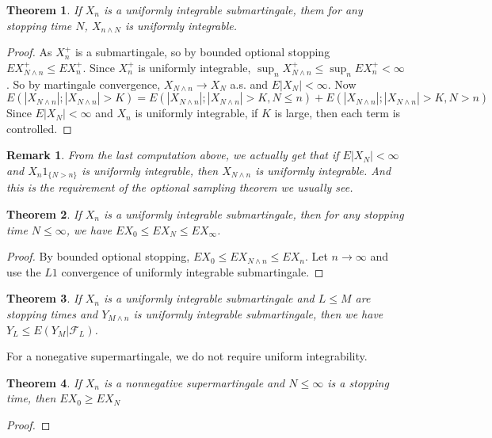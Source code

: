 \documentclass{article}
\newtheorem{Thm}{Theorem}[section]
\newtheorem*{Rk}{Remark}
\theoremstyle{definition}
\begin{document}
\begin{Thm}
    If $X_n$ is a uniformly integrable submartingale, them for any stopping time $N$,
    $X_{n\wedge N}$ is uniformly integrable.
\end{Thm}
\begin{proof}
    As $X_n^+$ is a submartingale, so by bounded optional stopping $EX_{N\wedge n}^+ \le EX_n^+$.
    Since $X_n^+$ is uniformly integrable, $\sup_n X_{N\wedge n}^+ \le \sup_n EX_n^+ <\infty$. So by martingale convergence, $X_{N\wedge n}\to X_N$ a.s. and $E|X_N|<\infty$.
    Now
    \begin{equation*}
        E(|X_{N\wedge n}|;|X_{N\wedge n}|>K) = E(|X_{N\wedge n}|;|X_{N\wedge n}|>K,N\le n)+E(|X_{N\wedge n}|;|X_{N\wedge n}|>K,N>n)
    \end{equation*}
    Since $E|X_N|<\infty$ and $X_n$ is uniformly integrable, if $K$ is large, then each term is controlled.

\end{proof}
\begin{Rk}
    From the last computation above, we actually get that if $E|X_N|<\infty$ and $X_n1_{\{N>n\}}$ is uniformly integrable,
    then $X_{N\wedge n}$ is uniformly integrable. And this is the requirement of the optional sampling theorem we usually see.
\end{Rk}

\begin{Thm}
    If $X_n$ is a uniformly integrable submartingale, then for any stopping time $N\le \infty$,
    we have $EX_0\le EX_N\le EX_\infty$. 
\end{Thm}
\begin{proof}
    By bounded optional stopping, $EX_0\le EX_{N\wedge n}\le EX_n$. Let $n\to\infty$ and use the $L1$ convergence of uniformly integrable submartingale.
\end{proof}

\begin{Thm}
    If $X_n$ is a uniformly integrable submartingale and $L\le M$ are stopping times and $Y_{M\wedge n}$ is uniformly integrable submartingale,
    then we have $Y_L\le E(Y_M|\mathcal{F}_L)$. 
\end{Thm}

For a nonegative supermartingale, we do not require uniform integrability.
\begin{Thm}
    If $X_n$ is a nonnegative supermartingale and $N\le\infty$ is a stopping time,
    then $EX_0\ge EX_N$
\end{Thm}
\begin{proof}
    
\end{proof}
\end{document}
